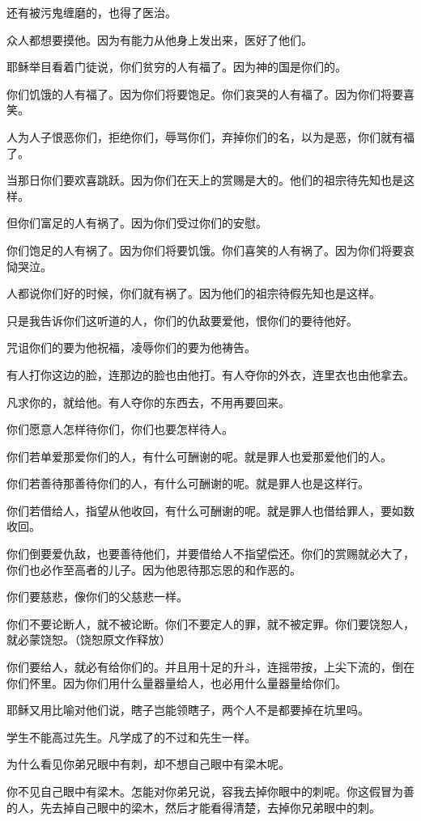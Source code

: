 \documentclass[12pt,oneside]{book}
\begin{document}
还有被污鬼缠磨的，也得了医治。

众人都想要摸他。因为有能力从他身上发出来，医好了他们。

耶稣举目看着门徒说，你们贫穷的人有福了。因为神的国是你们的。

你们饥饿的人有福了。因为你们将要饱足。你们哀哭的人有福了。因为你们将要喜笑。

人为人子恨恶你们，拒绝你们，辱骂你们，弃掉你们的名，以为是恶，你们就有福了。

当那日你们要欢喜跳跃。因为你们在天上的赏赐是大的。他们的祖宗待先知也是这样。

但你们富足的人有祸了。因为你们受过你们的安慰。

你们饱足的人有祸了。因为你们将要饥饿。你们喜笑的人有祸了。因为你们将要哀恸哭泣。

人都说你们好的时候，你们就有祸了。因为他们的祖宗待假先知也是这样。

只是我告诉你们这听道的人，你们的仇敌要爱他，恨你们的要待他好。

咒诅你们的要为他祝福，凌辱你们的要为他祷告。

有人打你这边的脸，连那边的脸也由他打。有人夺你的外衣，连里衣也由他拿去。

凡求你的，就给他。有人夺你的东西去，不用再要回来。

你们愿意人怎样待你们，你们也要怎样待人。

你们若单爱那爱你们的人，有什么可酬谢的呢。就是罪人也爱那爱他们的人。

你们若善待那善待你们的人，有什么可酬谢的呢。就是罪人也是这样行。

你们若借给人，指望从他收回，有什么可酬谢的呢。就是罪人也借给罪人，要如数收回。

你们倒要爱仇敌，也要善待他们，并要借给人不指望偿还。你们的赏赐就必大了，你们也必作至高者的儿子。因为他恩待那忘恩的和作恶的。

你们要慈悲，像你们的父慈悲一样。

你们不要论断人，就不被论断。你们不要定人的罪，就不被定罪。你们要饶恕人，就必蒙饶恕。（饶恕原文作释放）

你们要给人，就必有给你们的。并且用十足的升斗，连摇带按，上尖下流的，倒在你们怀里。因为你们用什么量器量给人，也必用什么量器量给你们。

耶稣又用比喻对他们说，瞎子岂能领瞎子，两个人不是都要掉在坑里吗。

学生不能高过先生。凡学成了的不过和先生一样。

为什么看见你弟兄眼中有刺，却不想自己眼中有梁木呢。

你不见自己眼中有梁木。怎能对你弟兄说，容我去掉你眼中的刺呢。你这假冒为善的人，先去掉自己眼中的梁木，然后才能看得清楚，去掉你兄弟眼中的刺。
\end{document}
